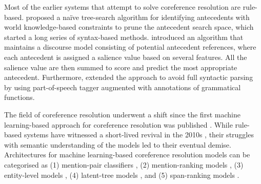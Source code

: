 \documentclass[11pt]{article}
\begin{document}
Most of the earlier systems that attempt to solve coreference resolution are rule-based. \textcite{hobbs1978} proposed a naïve tree-search algorithm for identifying antecedents with world knowledge-based constraints to prune the antecedent search space, which started a long series of syntax-based methods. \textcite{lappin1994} introduced an algorithm that maintains a discourse model consisting of potential antecedent references, where each antecedent is assigned a salience value based on several features. All the salience value are then summed to score and predict the most appropriate antecedent. Furthermore, \textcite{kennedy1996} extended the approach to avoid full syntactic parsing by using part-of-speech tagger augmented with annotations of grammatical functions.

The field of coreference resolution underwent a shift since the first machine learning-based approach for coreference resolution was published \parencite{ConnollyEtAl:94}. While rule-based systems have witnessed a short-lived revival in the 2010s \parencite{zhou2004, haghighi2009}, their struggles with semantic understanding of the models led to their eventual demise. Architectures for machine learning-based coreference resolution models can be categorised as (1) mention-pair classifiers \parencite{ng2002identifying,bengtson2008understanding}, (2) mention-ranking models \parencite{durrett2013easy,wiseman2015learning,clark2016deep,denis-baldridge-2008-specialized}, (3) entity-level models \parencite{haghighi-klein-2010-coreference,wiseman-etal-2016-learning,clark-manning-2015-entity,clark-manning-2016-improving}, (4) latent-tree models \parencite{fernandes-etal-2012-latent,martschat-strube-2015-latent,bjorkelund-kuhn-2014-learning}, and (5) span-ranking models \parencite{lee2017end,lee2018higher,joshi2019coref}.

\end{document}
